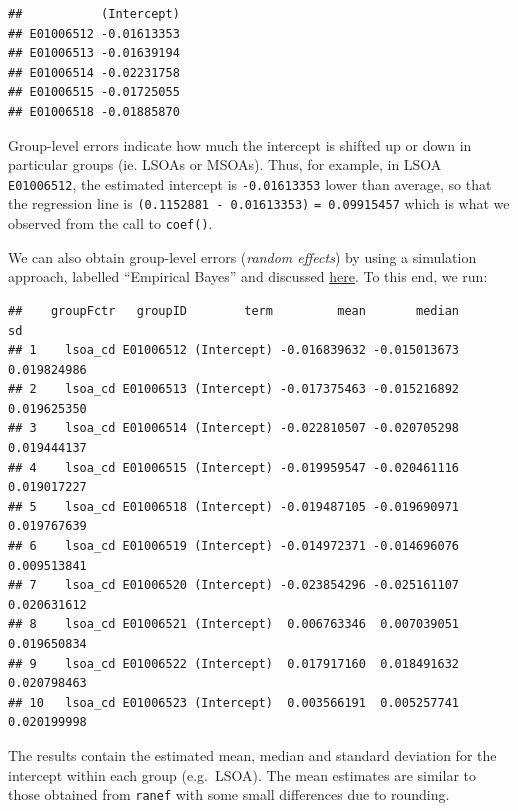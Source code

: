 \documentclass[]{book}
\newenvironment{Shaded}{\begin{snugshade}}{\end{snugshade}}
\newcommand{\KeywordTok}[1]{\textcolor[rgb]{0.13,0.29,0.53}{\textbf{#1}}}
\newcommand{\DecValTok}[1]{\textcolor[rgb]{0.00,0.00,0.81}{#1}}
\newcommand{\StringTok}[1]{\textcolor[rgb]{0.31,0.60,0.02}{#1}}
\newcommand{\CommentTok}[1]{\textcolor[rgb]{0.56,0.35,0.01}{\textit{#1}}}
\newcommand{\OperatorTok}[1]{\textcolor[rgb]{0.81,0.36,0.00}{\textbf{#1}}}
\newcommand{\NormalTok}[1]{#1}
\begin{document}
\begin{verbatim}
##           (Intercept)
## E01006512 -0.01613353
## E01006513 -0.01639194
## E01006514 -0.02231758
## E01006515 -0.01725055
## E01006518 -0.01885870
\end{verbatim}

Group-level errors indicate how much the intercept is shifted up or down
in particular groups (ie. LSOAs or MSOAs). Thus, for example, in LSOA
\texttt{E01006512}, the estimated intercept is \texttt{-0.01613353}
lower than average, so that the regression line is
\texttt{(0.1152881\ -\ 0.01613353)} \texttt{=\ 0.09915457} which is what
we observed from the call to \texttt{coef()}.

We can also obtain group-level errors (\emph{random effects}) by using a
simulation approach, labelled ``Empirical Bayes'' and discussed
\href{https://stat.ethz.ch/pipermail/r-sig-mixed-models/2009q4/002984.html}{here}.
To this end, we run:

\begin{Shaded}
\end{Shaded}

\begin{verbatim}
##    groupFctr   groupID        term         mean       median          sd
## 1    lsoa_cd E01006512 (Intercept) -0.016839632 -0.015013673 0.019824986
## 2    lsoa_cd E01006513 (Intercept) -0.017375463 -0.015216892 0.019625350
## 3    lsoa_cd E01006514 (Intercept) -0.022810507 -0.020705298 0.019444137
## 4    lsoa_cd E01006515 (Intercept) -0.019959547 -0.020461116 0.019017227
## 5    lsoa_cd E01006518 (Intercept) -0.019487105 -0.019690971 0.019767639
## 6    lsoa_cd E01006519 (Intercept) -0.014972371 -0.014696076 0.009513841
## 7    lsoa_cd E01006520 (Intercept) -0.023854296 -0.025161107 0.020631612
## 8    lsoa_cd E01006521 (Intercept)  0.006763346  0.007039051 0.019650834
## 9    lsoa_cd E01006522 (Intercept)  0.017917160  0.018491632 0.020798463
## 10   lsoa_cd E01006523 (Intercept)  0.003566191  0.005257741 0.020199998
\end{verbatim}

The results contain the estimated mean, median and standard deviation
for the intercept within each group (e.g.~LSOA). The mean estimates are
similar to those obtained from \texttt{ranef} with some small
differences due to rounding.
\end{document}

